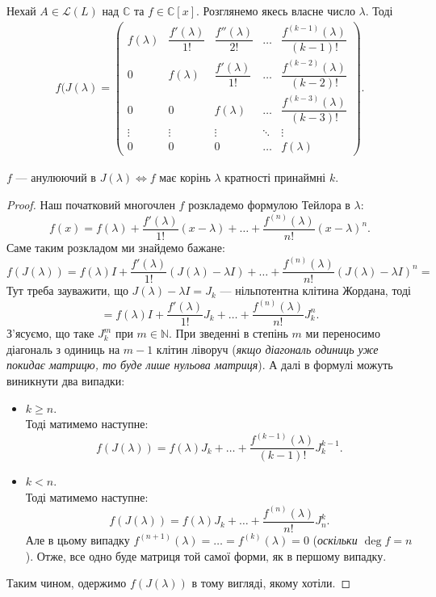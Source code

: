 \documentclass{math_library}
\begin{document}
\begin{theorem}
Нехай $A \in \mathcal{L}(L)$ над $\mathbb{C}$ та $f \in \mathbb{C}[x]$. Розглянемо якесь власне число $\lambda$. Тоді
\begin{align*}
f(J(\lambda) = \begin{pmatrix}
 f(\lambda) & \dfrac{f'(\lambda)}{1!} & \dfrac{f''(\lambda)}{2!} & \dots & \dfrac{f^{(k-1)}(\lambda)}{(k-1)!} \\
 0 & f(\lambda) & \dfrac{f'(\lambda)}{1!} & \dots & \dfrac{f^{(k-2)}(\lambda)}{(k-2)!} \\
 0 & 0 & f(\lambda) & \dots & \dfrac{f^{(k-3)}(\lambda)}{(k-3)!} \\
 \vdots & \vdots & \vdots & \ddots & \vdots \\
 0 & 0 & 0 & \dots & f(\lambda) 
\end{pmatrix}.
\end{align*}
\end{theorem}

\begin{remark}
$f$ --- анулюючий в $J(\lambda) \iff f$ має корінь $\lambda$ кратності принаймні $k$.
\end{remark}

\begin{proof}
Наш початковий многочлен $f$ розкладемо формулою Тейлора в $\lambda$:
\[
f(x) = f(\lambda) + \dfrac{f'(\lambda)}{1!}(x-\lambda) + \dots + \dfrac{f^{(n)}(\lambda)}{n!}(x-\lambda)^n.
\]
Саме таким розкладом ми знайдемо бажане:
\[
f(J(\lambda)) = f(\lambda)I + \dfrac{f'(\lambda)}{1!}(J(\lambda) - \lambda I) + \dots + \dfrac{f^{(n)}(\lambda)}{n!}(J(\lambda)-\lambda I)^n \boxed{=}
\]
Тут треба зауважити, що $J(\lambda) - \lambda I = J_k$ --- нільпотентна клітина Жордана, тоді
\[
\boxed{=} f(\lambda)I + \dfrac{f'(\lambda)}{1!}J_k + \dots + \dfrac{f^{(n)}(\lambda)}{n!}J^n_k.
\]
З'ясуємо, що таке $J_k^m$ при $m \in \mathbb{N}$. При зведенні в степінь $m$ ми переносимо діагональ з одиниць на $m-1$ клітин ліворуч (\textit{якщо діагональ одиниць уже покидає матрицю, то буде лише нульова матриця}). А далі в формулі можуть виникнути два випадки:
\begin{itemize}[wide=0pt,nosep,wide=0pt]
\item $k \geq n$.\\
Тоді матимемо наступне:
\[
f(J(\lambda)) = f(\lambda)J_k + \dots + \dfrac{f^{(k-1)}(\lambda)}{(k-1)!}J^{k-1}_k.
\]

\item $k < n$.\\
Тоді матимемо наступне:
\[
f(J(\lambda)) = f(\lambda)J_k + \dots + \dfrac{f^{(n)}(\lambda)}{n!}J_n^k.
\]
Але в цьому випадку $f^{(n+1)}(\lambda) = \dots = f^{(k)}(\lambda) = 0$ (\textit{оскільки $\deg f = n$}). Отже, все одно буде матриця той самої форми, як в першому випадку.
\end{itemize}
Таким чином, одержимо $f(J(\lambda))$ в тому вигляді, якому хотіли.
\end{proof}
\end{document}

